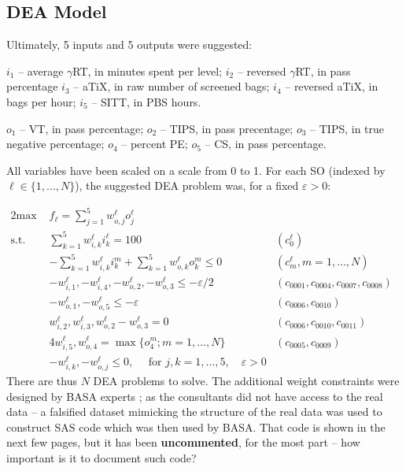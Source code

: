 \subsection{DEA Model}
Ultimately, 5 inputs and 5 outputs were suggested:
\begin{description}[noitemsep]
\item[Inputs] $i_1$ -- average $\gamma$RT, in minutes spent per level; $i_2$ -- reversed $\gamma$RT, in pass percentage $i_3$ -- aTiX, in raw number of screened bags; $i_4$ -- reversed aTiX, in bags per hour; $i_5$ -- SITT, in PBS hours.
\item[Outputs] $o_1$ -- VT, in pass percentage; $o_2$ -- TIPS, in pass precentage; $o_3$ -- TIPS, in true negative percentage; $o_4$ -- percent PE; $o_5$ -- CS, in pass percentage.
\end{description}
All variables have been scaled on a scale from 0 to 1. 
For each SO (indexed by $\ell\in\{1,\ldots,N\}$), the suggested DEA problem was, for a fixed $\varepsilon>0$: 

\begin{alignat*}{2}
    \text{max }   & f_{\ell}=\sum_{j=1}^5w^{\ell}_{o,j}o^{\ell}_j & &\  \\
    \text{s.t. } & \sum_{k=1}^{5}w^{\ell}_{i,k}i^{\ell}_k =100 & (c^{\ell}_0)& \\
    & -\sum_{k=1}^{5}w^{\ell}_{i,k}i^{m}_k + \sum_{k=1}^{5}w^{\ell}_{o,k}o^{m}_k \leq 0  & (c^{\ell}_m, m=1,\ldots,N) & \\
                       & -w^{\ell}_{i,1},-w^{\ell}_{i,4},-w^{\ell}_{o,2},-w^{\ell}_{o,3}\leq -\varepsilon/2 & (c_{0001},c_{0004},c_{0007},c_{0008}) & \\
                       & -w^{\ell}_{o,1},-w^{\ell}_{o,5}\leq -\varepsilon & (c_{0006},c_{0010}) & \\
                       & w^{\ell}_{i,2},w^{\ell}_{i,3},w^{\ell}_{o,2}-w^{\ell}_{o,3}=0 & (c_{0006},c_{0010},c_{0011}) & \\
                       & 4w^{\ell}_{i,5},w^{\ell}_{o,4}=\max\{o^{m}_4;m=1,\ldots,N\} & (c_{0005},c_{0009}) & \\
                       & -w^{\ell}_{i,k},-w^{\ell}_{o,j}\leq 0, \quad\text{ for }j,k=1,\ldots,5,\quad \varepsilon>0 & & 
  \end{alignat*}
There are thus $N$ DEA problems to solve. The additional weight constraints were designed by BASA experts ; as the consultants did not have access to the real data -- a falsified dataset mimicking the structure of the real data was used to construct SAS code which was then used by BASA. That code is shown in the next few pages, but it has been \textbf{uncommented}, for the most part -- how important is it to document such code? 

